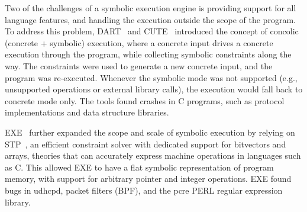 


Two of the challenges of a symbolic execution engine is providing support for all language features, and handling the execution outside the scope of the program.  To address this problem, DART~\cite{dart} and CUTE~\cite{cute} introduced the concept of concolic (concrete + symbolic) execution, where a concrete input drives a concrete execution through the program, while collecting symbolic constraints along the way.  The constraints were used to generate a new concrete input, and the program was re-executed.  Whenever the symbolic mode was not supported (e.g., unsupported operations or external library calls), the execution would fall back to concrete mode only.  The tools found crashes in C programs, such as protocol implementations and data structure libraries.









EXE~\cite{exe} further expanded the scope and scale of symbolic execution by relying on STP~\cite{stp}, an efficient constraint solver with dedicated support for bitvectors and arrays, theories that can accurately express machine operations in languages such as C.
%
This allowed EXE to have a flat symbolic representation of program memory, with support for arbitrary pointer and integer operations.
%
EXE found bugs in udhcpd, packet filters (BPF), and the pcre PERL regular expression library.

